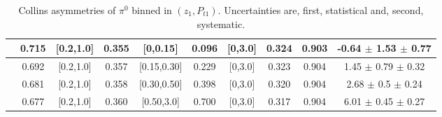 \begin{table}[H]
\begin{tabular}{|c| c| c| c| c| c| c| c| c| c|}
 \hline                                                                                                                                                          
[0.7,1.0]	&	0.715	&	[0.2,1.0]	&	0.355	&	[0,0.15]	&	0.096	&	[0,3.0]	&	0.324	&	0.903	&-0.64  $\pm$ 1.53  $\pm$ 0.77   \\ \hline
[0.7,1.0]	&	0.692	&	[0.2,1.0]	&	0.357	&	[0.15,0.30]	&	0.229	&	[0,3.0]	&	0.323	&	0.904	&1.45  $\pm$ 0.79  $\pm$ 0.32    \\ \hline
[0.7,1.0]	&	0.681	&	[0.2,1.0]	&	0.358	&	[0.30,0.50]	&	0.398	&	[0,3.0]	&	0.320	&	0.904	&2.68  $\pm$ 0.5  $\pm$ 0.24    \\ \hline          
[0.7,1.0]	&	0.677	&	[0.2,1.0]	&	0.360	&	[0.50,3.0]	&	0.700	&	[0,3.0]	&	0.317	&	0.904	& 6.01  $\pm$ 0.45  $\pm$ 0.27   \\ \hline
\end{tabular}
\caption[Collins asymmetries of $\pi^0$ binned in $(z_{1},P_{t1})$]{Collins asymmetries of $\pi^0$ binned in $(z_{1},P_{t1})$. Uncertainties are, first, statistical and, second, systematic.}
\label{tab:finalpi0ptbins}
\end{table}

